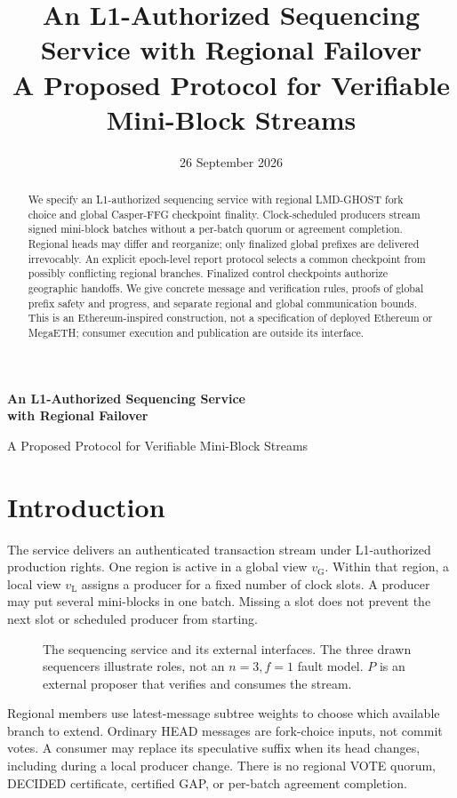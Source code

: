 \documentclass[11pt,a4paper,onecolumn]{article}
\title{An L1-Authorized Sequencing Service with Regional Failover\\
\large A Proposed Protocol for Verifiable Mini-Block Streams}
\author{}\date{26 September 2026}
\newcommand{\gv}{v_{\mathrm G}}
\newcommand{\lv}{v_{\mathrm L}}
\theoremstyle{remark}\newtheorem{example}[definition]{Example}
\newcounter{protocol}
\begin{document}
\begin{center}
{\Large\bfseries An L1-Authorized Sequencing Service\\with Regional Failover\par}
\vspace{.5em}
{\normalsize A Proposed Protocol for Verifiable Mini-Block Streams\par}
\vspace{.4em}{\small 26 September 2026}
\end{center}
\begin{abstract}
We specify an L1-authorized sequencing service with regional LMD-GHOST fork
choice and global Casper-FFG checkpoint finality. Clock-scheduled producers
stream signed mini-block batches without a per-batch quorum or agreement
completion. Regional heads may differ and reorganize; only finalized global
prefixes are delivered irrevocably. An explicit epoch-level report protocol
selects a common checkpoint from possibly conflicting regional branches.
Finalized control checkpoints authorize geographic handoffs. We give concrete
message and verification rules, proofs of global prefix safety and progress,
and separate regional and global communication bounds. This is an
Ethereum-inspired construction, not a specification of deployed Ethereum or
MegaETH; consumer execution and publication are outside its interface.
\end{abstract}

\section{Introduction}\label{sec:intro}
The service delivers an authenticated transaction stream under L1-authorized
production rights. One region is active in a global view $\gv$. Within that
region, a local view $\lv$ assigns a producer for a fixed number of clock slots.
A producer may put several mini-blocks in one batch. Missing a slot does not
prevent the next slot or scheduled producer from starting.

\begin{figure}[H]\centering

\caption{The sequencing service and its external interfaces. The three drawn
sequencers illustrate roles, not an $n=3,f=1$ fault model. $P$ is an external
proposer that verifies and consumes the stream.}
\label{fig:architecture}
\end{figure}

Regional members use latest-message subtree weights to choose which available
branch to extend. Ordinary HEAD messages are fork-choice inputs, not commit
votes. A consumer may replace its speculative suffix when its head changes,
including during a local producer change. There is no regional VOTE quorum,
DECIDED certificate, certified GAP, or per-batch agreement completion.
\end{document}
